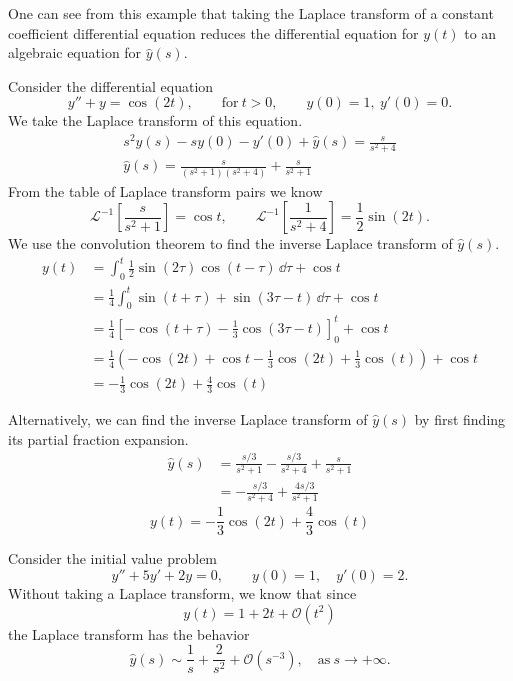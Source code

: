 One can see from this example that taking the Laplace transform of a 
constant coefficient differential equation reduces the differential equation
for $y(t)$ to an algebraic equation for $\hat{y}(s)$.






\begin{Example}
  Consider the differential equation
  \[ 
  y'' + y = \cos(2t), \qquad \mathrm{for}\ t>0, \qquad y(0)=1,\ y'(0)=0.
  \]
  We take the Laplace transform of this equation.
  \begin{gather*}
    s^2 \hat{y}(s) - s y(0) - y'(0) + \hat{y}(s) = \frac{s}{s^2+4} \\
    \hat{y}(s) = \frac{s}{(s^2+1)(s^2+4)} + \frac{s}{s^2+1}
  \end{gather*}
  From the table of Laplace transform pairs we know
  \[
  \mathcal{L}^{-1}\left[\frac{s}{s^2+1}\right] = \cos t, \qquad
  \mathcal{L}^{-1}\left[\frac{1}{s^2+4}\right] = \frac{1}{2} \sin(2t).
  \]
  We use the convolution theorem to find the inverse Laplace transform 
  of $\hat{y}(s)$.
  \begin{align*}
    y(t)    
    &= \int_0^t \frac{1}{2}\sin(2\tau) \cos(t-\tau)\,\dd \tau + \cos t \\
    &= \frac{1}{4}\int_0^t \sin(t+\tau) + \sin(3\tau-t)\,\dd \tau + \cos t \\
    &= \frac{1}{4}\left[-\cos(t+\tau) - \frac{1}{3}\cos(3\tau-t)\right]_0^t + \cos t \\
    &= \frac{1}{4}\left(-\cos(2t)+ \cos t -\frac{1}{3}\cos(2t) +
      \frac{1}{3}\cos(t) \right) + \cos t \\
    &= -\frac{1}{3}\cos(2t) + \frac{4}{3} \cos(t) 
  \end{align*}

  Alternatively, we can find the inverse Laplace transform of $\hat{y}(s)$ by
  first finding its partial fraction expansion.
  \begin{align*}
    \hat{y}(s)    
    &= \frac{s/3}{s^2+1} - \frac{s/3}{s^2+4} + \frac{s}{s^2+1} \\
    &= - \frac{s/3}{s^2+4} + \frac{4 s/3}{s^2+1}
  \end{align*}
  \[
  y(t) = - \frac{1}{3} \cos(2 t) + \frac{4}{3} \cos(t)
  \]
\end{Example}









\begin{Example}
  Consider the initial value problem
  \[
  y'' + 5 y' + 2 y = 0, \qquad y(0) = 1, \quad y'(0) = 2.
  \]
  Without taking a Laplace transform, we know that since
  \[
  y(t) = 1 + 2 t + \mathcal{O}(t^2)
  \]
  the Laplace transform has the behavior
  \[
  \hat{y}(s) \sim \frac{1}{s} + \frac{2}{s^2} + \mathcal{O}(s^{-3}),
  \quad \mathrm{as}\ s \to + \infty.
  \]
\end{Example}








